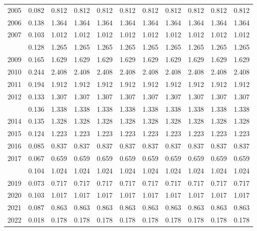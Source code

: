 \documentclass[
]{article}
\begin{document}
\begin{longtable}[t]{lrrrrrrrrrr}
2005 & 0.082 & 0.812 & 0.812 & 0.812 & 0.812 & 0.812 & 0.812 & 0.812 & 0.812 & 0.812\\
2006 & 0.138 & 1.364 & 1.364 & 1.364 & 1.364 & 1.364 & 1.364 & 1.364 & 1.364 & 1.364\\
2007 & 0.103 & 1.012 & 1.012 & 1.012 & 1.012 & 1.012 & 1.012 & 1.012 & 1.012 & 1.012\\
\addlinespace
2008 & 0.128 & 1.265 & 1.265 & 1.265 & 1.265 & 1.265 & 1.265 & 1.265 & 1.265 & 1.265\\
2009 & 0.165 & 1.629 & 1.629 & 1.629 & 1.629 & 1.629 & 1.629 & 1.629 & 1.629 & 1.629\\
2010 & 0.244 & 2.408 & 2.408 & 2.408 & 2.408 & 2.408 & 2.408 & 2.408 & 2.408 & 2.408\\
2011 & 0.194 & 1.912 & 1.912 & 1.912 & 1.912 & 1.912 & 1.912 & 1.912 & 1.912 & 1.912\\
2012 & 0.133 & 1.307 & 1.307 & 1.307 & 1.307 & 1.307 & 1.307 & 1.307 & 1.307 & 1.307\\
\addlinespace
2013 & 0.136 & 1.338 & 1.338 & 1.338 & 1.338 & 1.338 & 1.338 & 1.338 & 1.338 & 1.338\\
2014 & 0.135 & 1.328 & 1.328 & 1.328 & 1.328 & 1.328 & 1.328 & 1.328 & 1.328 & 1.328\\
2015 & 0.124 & 1.223 & 1.223 & 1.223 & 1.223 & 1.223 & 1.223 & 1.223 & 1.223 & 1.223\\
2016 & 0.085 & 0.837 & 0.837 & 0.837 & 0.837 & 0.837 & 0.837 & 0.837 & 0.837 & 0.837\\
2017 & 0.067 & 0.659 & 0.659 & 0.659 & 0.659 & 0.659 & 0.659 & 0.659 & 0.659 & 0.659\\
\addlinespace
2018 & 0.104 & 1.024 & 1.024 & 1.024 & 1.024 & 1.024 & 1.024 & 1.024 & 1.024 & 1.024\\
2019 & 0.073 & 0.717 & 0.717 & 0.717 & 0.717 & 0.717 & 0.717 & 0.717 & 0.717 & 0.717\\
2020 & 0.103 & 1.017 & 1.017 & 1.017 & 1.017 & 1.017 & 1.017 & 1.017 & 1.017 & 1.017\\
2021 & 0.087 & 0.863 & 0.863 & 0.863 & 0.863 & 0.863 & 0.863 & 0.863 & 0.863 & 0.863\\
2022 & 0.018 & 0.178 & 0.178 & 0.178 & 0.178 & 0.178 & 0.178 & 0.178 & 0.178 & 0.178\\*
\end{longtable}
\end{document}
